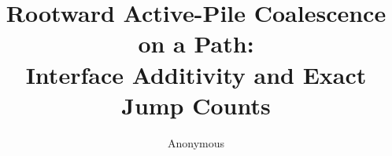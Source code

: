 \documentclass[10pt,a4paper]{amsart}
\title[Rootward active-pile coalescence]{Rootward Active-Pile Coalescence on a Path:\\
Interface Additivity and Exact Jump Counts}
\author{Anonymous}
\date{}
\theoremstyle{definition}
\theoremstyle{remark}
\begin{document}
\begin{abstract}

\end{abstract}

\maketitle










\end{document}
